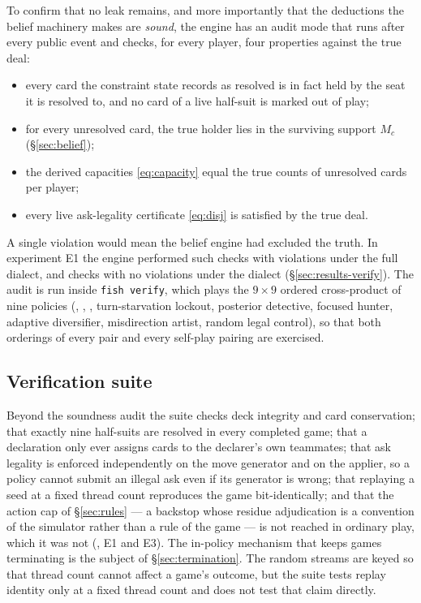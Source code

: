 To confirm that no leak remains, and more importantly that the deductions the
belief machinery makes are \emph{sound}, the engine has an audit mode that runs
after every public event and checks, for every player, four properties against
the true deal:

\begin{itemize}
  \item every card the constraint state records as resolved is in fact held by
        the seat it is resolved to, and no card of a live half-suit is marked out
        of play;
  \item for every unresolved card, the true holder lies in the surviving support
        $M_c$ (\S\ref{sec:belief});
  \item the derived capacities \eqref{eq:capacity} equal the true counts of
        unresolved cards per player;
  \item every live ask-legality certificate \eqref{eq:disj} is satisfied by the
        true deal.
\end{itemize}

A single violation would mean the belief engine had excluded the truth. In
experiment E1 the engine performed \textbf{\numAuditChecks} such checks with
\textbf{\numAuditViolations} violations under the full dialect, and
\textbf{\numAuditChecksLegacy} checks with no violations under the \vthree{}
dialect (\S\ref{sec:results-verify}). The audit is run inside \texttt{fish
verify}, which plays the $9 \times 9$ ordered cross-product of nine policies
(\vfast{}, \vthree{}, \vtwo{}, turn-starvation lockout, posterior detective,
focused hunter, adaptive diversifier, misdirection artist, random legal control),
so that both orderings of every pair and every self-play pairing are exercised.

\subsection{Verification suite}

Beyond the soundness audit the suite checks deck integrity and card
conservation; that exactly nine half-suits are resolved in every completed game;
that a declaration only ever assigns cards to the declarer's own teammates; that
ask legality is enforced independently on the move generator and on the applier,
so a policy cannot submit an illegal ask even if its generator is wrong; that
replaying a seed at a fixed thread count reproduces the game bit-identically;
and that the action cap of \S\ref{sec:rules} --- a backstop whose residue
adjudication is a convention of the simulator rather than a rule of the game ---
is not reached in ordinary play, which it was not (\numLimitRate{}, E1 and E3).
The in-policy mechanism that keeps games terminating is the subject of
\S\ref{sec:termination}. The random streams are keyed so that thread count
cannot affect a game's outcome, but the suite tests replay identity only at a
fixed thread count and does not test that claim directly.
